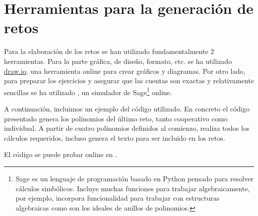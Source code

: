 

\section{Herramientas para la generación de retos}

Para la elaboración de los retos se han utilizado fundamentalmente 2 herramientas.
%
Para la parte gráfica, de diseño, formato, etc. se ha utilizado \url{draw.io}, una herramienta online para crear gráficos y diagramas.
%
Por otro lado, para preparar los ejercicios y asegurar que las cuentas son exactas y relativamente sencillas se ha utilizado , un simulador de Sage\footnote{Sage es un lenguaje de programación basado en Python pensado para resolver cálculos simbólicos.
%
Incluye muchas funciones para trabajar algebraicamente, por ejemplo, incorpora funcionalidad para trabajar con estructuras algebraicas como son los ideales de anillos de polinomios.
} online.

A continuación, incluimos un ejemplo del código utilizado. 
%
En concreto el código presentado genera los polinomios del último reto, tanto cooperativo como individual.
%
A partir de cuatro polinomios definidos al comienzo, realiza todos los cálculos requeridos, incluso genera el texto para ser incluido en los retos.

El código se puede probar online en  \citep{Sage}.


